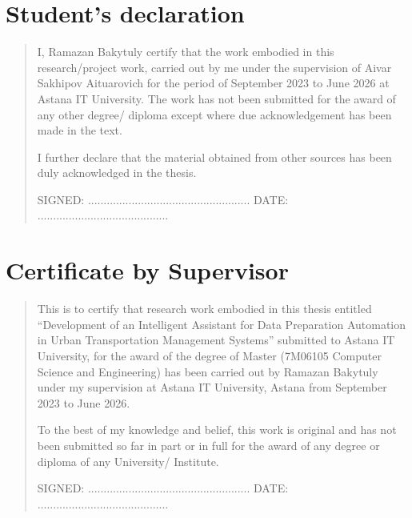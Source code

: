 %
%
\chapter{Student's declaration}
\begin{SingleSpace}
\begin{quote}
I, Ramazan Bakytuly certify that the work embodied in this research/project work, carried out by me under the supervision of Aivar Sakhipov Aituarovich for the period of September 2023 to June 2026 at Astana IT University.  The work has not been submitted for the award of any other degree/ diploma except where due acknowledgement has been made in the text.

I further declare that the material obtained from other sources has been duly acknowledged in the thesis.

\vspace{1.5cm}
\noindent
\hspace{-0.75cm}\textsc{SIGNED: .................................................... DATE: ..........................................}

\end{quote}
\end{SingleSpace}
\chapter{Certificate by Supervisor}
\begin{SingleSpace}
\begin{quote}
This is to certify that research work embodied in this thesis entitled ``Development of an Intelligent Assistant for Data Preparation Automation in Urban Transportation Management Systems'' submitted to Astana IT University, for the award of the degree of Master (7M06105 Computer Science and Engineering) has been carried out by Ramazan Bakytuly under my supervision at Astana IT University, Astana from September 2023 to June 2026.

To the best of my knowledge and belief, this work is original and has not been submitted so far in part or in full for the award of any degree or diploma of any University/ Institute.

\vspace{1.5cm}
\noindent
\hspace{-0.75cm}\textsc{SIGNED: .................................................... DATE: ..........................................}

\end{quote}
\end{SingleSpace}
\clearpage